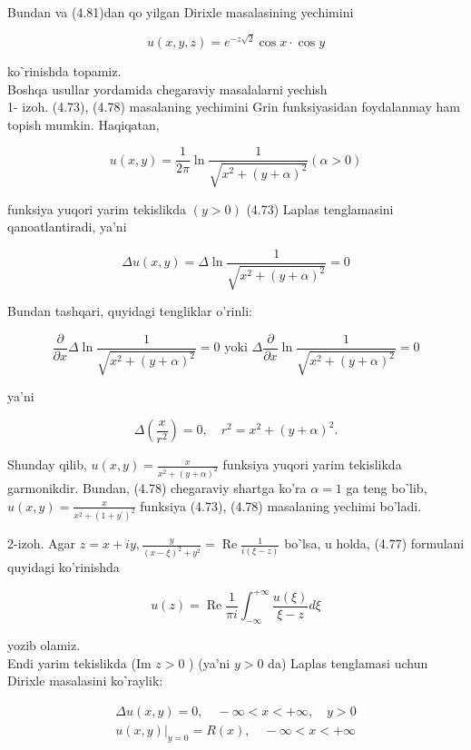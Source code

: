 \documentclass[10pt]{article}
\begin{document}
Bundan va (4.81)dan qo yilgan Dirixle masalasining yechimini

$$
u(x, y, z)=e^{-z \sqrt{2}} \cos x \cdot \cos y
$$

koˋrinishda topamiz.\\
Boshqa usullar yordamida chegaraviy masalalarni yechish\\
1- izoh. (4.73), (4.78) masalaning yechimini Grin funksiyasidan foydalanmay ham topish mumkin. Haqiqatan,

$$
u(x, y)=\frac{1}{2 \pi} \ln \frac{1}{\sqrt{x^{2}+(y+\alpha)^{2}}}(\alpha>0)
$$

funksiya yuqori yarim tekislikda $(y>0)$ (4.73) Laplas tenglamasini qanoatlantiradi, ya'ni

$$
\Delta u(x, y)=\Delta \ln \frac{1}{\sqrt{x^{2}+(y+\alpha)^{2}}}=0
$$

Bundan tashqari, quyidagi tengliklar o'rinli:

$$
\frac{\partial}{\partial x} \Delta \ln \frac{1}{\sqrt{x^{2}+(y+\alpha)^{2}}}=0 \text { yoki } \Delta \frac{\partial}{\partial x} \ln \frac{1}{\sqrt{x^{2}+(y+\alpha)^{2}}}=0
$$

ya'ni

$$
\Delta\left(\frac{x}{r^{2}}\right)=0, \quad r^{2}=x^{2}+(y+\alpha)^{2} .
$$

Shunday qilib, $u(x, y)=\frac{x}{x^{2}+(y+\alpha)^{2}}$ funksiya yuqori yarim tekislikda garmonikdir. Bundan, (4.78) chegaraviy shartga ko'ra $\alpha=1$ ga teng boˋlib, $u(x, y)=\frac{x}{x^{2}+\left(1+y^{\prime}\right)^{2}}$ funksiya (4.73), (4.78) masalaning yechimi bo'ladi.

2-izoh. Agar $z=x+i y, \frac{y}{(x-\xi)^{2}+y^{2}}=\operatorname{Re} \frac{1}{i(\xi-z)}$ boˋlsa, u holda, (4.77) formulani quyidagi ko'rinishda


\begin{equation*}
u(z)=\operatorname{Re} \frac{1}{\pi i} \int_{-\infty}^{+\infty} \frac{u(\xi)}{\xi-z} d \xi \tag{4.83}
\end{equation*}


yozib olamiz.\\
Endi yarim tekislikda (Im $z>0$ ) (ya'ni $y>0$ da) Laplas tenglamasi uchun Dirixle masalasini koˋraylik:

$$
\begin{gathered}
\Delta u(x, y)=0, \quad-\infty<x<+\infty, \quad y>0 \\
\left.u(x, y)\right|_{y=0}=R(x), \quad-\infty<x<+\infty
\end{gathered}
$$
\end{document}
